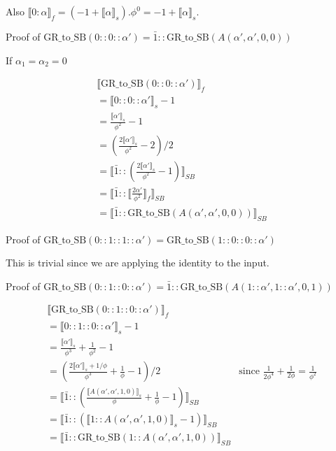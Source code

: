 \documentclass{cs4rep}
\begin{document}
Also $\llbracket 0:\alpha \rrbracket_{f} = (-1+\llbracket \alpha \rrbracket_{s}).\phi^{0} = -1+\llbracket \alpha \rrbracket_{s}$.


Proof of $\mbox{GR\_to\_SB}(0::0::\alpha') = \bar{1} :: \mbox{GR\_to\_SB}(A(\alpha',\alpha',0,0))$

If $\alpha_{1} = \alpha_{2} = 0$

\[ \begin{array}{l}
\llbracket \mbox{GR\_to\_SB}(0::0::\alpha') \rrbracket_{f} \\
= \llbracket 0::0::\alpha' \rrbracket_{s} - 1 \\
= \frac{\llbracket \alpha' \rrbracket_{s}}{\phi^{2}} - 1 \\
= (\frac{2 \llbracket \alpha' \rrbracket_{s}}{\phi^{2}} - 2)/2 \\
= \llbracket \bar{1} :: (\frac{2 \llbracket \alpha' \rrbracket_{s}}{\phi^{2}} -1 ) \rrbracket_{SB} \\
= \llbracket \bar{1} :: \llbracket \frac{2 \alpha' }{\phi^{2}} \rrbracket_{f} \rrbracket_{SB} \\
= \llbracket \bar{1} :: \mbox{GR\_to\_SB}(A(\alpha',\alpha',0,0)) \rrbracket_{SB}
\end{array} \]

Proof of $\mbox{GR\_to\_SB}(0::1::1::\alpha') = \mbox{GR\_to\_SB}(1::0::0::\alpha')$

This is trivial since we are applying the identity to the input.

Proof of $ \mbox{GR\_to\_SB}(0::1::0::\alpha') = \bar{1} :: \mbox{GR\_to\_SB}(A(1::\alpha',1::\alpha',0,1)) $

\[ \begin{array}{ll}
\llbracket \mbox{GR\_to\_SB}(0::1::0::\alpha') \rrbracket_{f} \\
= \llbracket 0::1::0::\alpha' \rrbracket_{s} - 1 \\
= \frac{\llbracket \alpha' \rrbracket_{s}}{\phi^{3}} + \frac{1}{\phi^{2}} - 1 \\
= (\frac{2 \llbracket \alpha' \rrbracket_{s} +1/\phi}{\phi^{3}} +\frac{1}{\phi}- 1)/2 & \mbox{since } \frac{1}{2\phi^{4}} + \frac{1}{2\phi} = \frac{1}{\phi^{2}}\\
= \llbracket \bar{1} :: (\frac{\llbracket A(\alpha',\alpha',1,0) \rrbracket_{s}}{\phi} + \frac{1}{\phi} -1 ) \rrbracket_{SB} \\
= \llbracket \bar{1} :: (\llbracket 1::A(\alpha',\alpha',1,0) \rrbracket_{s} -1 ) \rrbracket_{SB} \\
= \llbracket \bar{1} :: \mbox{GR\_to\_SB}(1::A(\alpha',\alpha',1,0)) \rrbracket_{SB}
\end{array} \]
\end{document}
